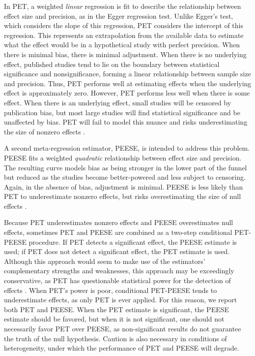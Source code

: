 \documentclass[man]{apa6}
\begin{document}
In PET, a weighted {\em linear} regression is fit to describe the relationship between effect size and precision, as in the Egger regression test. Unlike Egger's test, which considers the slope of this regression, PET considers the intercept of this regression. This represents an extrapolation from the available data to estimate what the effect would be in a hypothetical study with perfect precision. When there is minimal bias, there is minimal adjustment. When there is no underlying effect, published studies tend to lie on the boundary between statistical significance and nonsignificance, forming a linear relationship between sample size and precision. Thus, PET performs well at estimating effects when the underlying effect is approximately zero. However, PET performs less well when there is some effect. When there is an underlying effect, small studies will be censored by publication bias, but most large studies will find statistical significance and be unaffected by bias. PET will fail to model this nuance and risks underestimating the size of nonzero effects \citep{Stanley:Doucouliagos:2014}.

A second meta-regression estimator, PEESE, is intended to address this problem. PEESE fits a weighted {\em quadratic} relationship between effect size and precision. The resulting curve models bias as being stronger in the lower part of the funnel but reduced as the studies become better-powered and less subject to censoring. Again, in the absence of bias, adjustment is minimal. PEESE is less likely than PET to underestimate nonzero effects, but risks overestimating the size of null effects \citep{Stanley:Doucouliagos:2014}.

Because PET underestimates nonzero effects and PEESE overestimates null effects, sometimes PET and PEESE are combined as a two-step conditional PET-PEESE procedure. If PET detects a significant effect, the PEESE estimate is used; if PET does not detect a significant effect, the PET estimate is used. Although this approach would seem to make use of the estimators' complementary strengths and weaknesses, this approach may be exceedingly conservative, as PET has questionable statistical power for the detection of effects \citep{Gervais:2015}. When PET's power is poor, conditional PET-PEESE tends to underestimate effects, as only PET is ever applied. For this reason, we report both PET and PEESE. When the PET estimate is significant, the PEESE estimate should be favored, but when it is not significant, one should not necessarily favor PET over PEESE, as non-significant results do not guarantee the truth of the null hypothesis. Caution is also necessary in conditions of heterogeneity, under which the performance of PET and PEESE will degrade.
\end{document}
